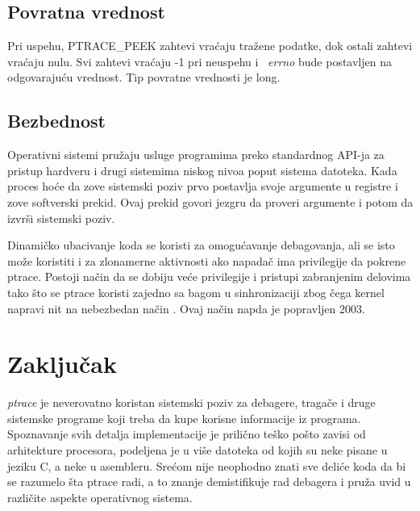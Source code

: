 \documentclass[a4paper]{article}
\begin{document}
\subsection{Povratna vrednost}	
\label{sec:return}

Pri uspehu, PTRACE\_PEEK zahtevi vraćaju tražene podatke, dok ostali zahtevi vraćaju nulu. 
Svi zahtevi vraćaju -1 pri neuspehu i ~\emph{errno} bude postavljen na odgovarajuću vrednost.
Tip povratne vrednosti je long.


\subsection{Bezbednost}	

Operativni sistemi pružaju usluge programima preko standardnog API-ja za pristup
hardveru i drugi sistemima niskog nivoa poput sistema datoteka. 
Kada proces hoće da zove sistemski poziv prvo postavlja svoje argumente u registre i 
zove softverski prekid. Ovaj prekid govori jezgru da proveri argumente i potom da
izvrši sistemski poziv.

Dinamičko ubacivanje koda se koristi za omogućavanje debagovanja, ali se isto može koristiti
i za zlonamerne aktivnosti ako napadač ima privilegije da pokrene ptrace. 
Postoji način da se dobiju veće privilegije i pristupi zabranjenim delovima tako što se ptrace koristi zajedno
sa bagom u sinhronizaciji zbog čega kernel napravi nit na nebezbedan način \cite{hack}. 
Ovaj način napda je popravljen 2003.

\section{Zaključak}

\emph{ptrace} je neverovatno koristan sistemski poziv za debagere, tragače i druge sistemske 
programe koji treba da kupe korisne informacije iz programa. Spoznavanje svih detalja implementacije 
je prilično teško pošto zavisi od arhitekture procesora, podeljena je u više datoteka od kojih su
neke pisane u jeziku C, a neke u asembleru. Srećom nije neophodno znati sve deliće koda da bi
se razumelo šta ptrace radi, a to znanje demistifikuje rad debagera i pruža uvid u različite 
aspekte operativnog sistema.

\appendix
 


\appendix
\end{document}

